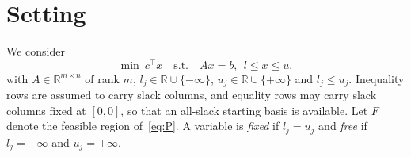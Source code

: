 \documentclass[11pt,a4paper]{article}
\theoremstyle{plain}
\theoremstyle{definition}
\theoremstyle{remark}
\newcommand{\R}{\mathbb{R}}
\begin{document}
\section{Setting}
\label{sec:setting}

We consider
\begin{equation}
  \min\ c^\top x \quad\text{s.t.}\quad Ax=b,\ \ l\le x\le u,
  \label{eq:P}
\end{equation}
with $A\in\R^{m\times n}$ of rank $m$, $l_j\in\R\cup\{-\infty\}$, $u_j\in\R\cup\{+\infty\}$ and $l_j\le u_j$. Inequality rows are assumed to carry slack columns, and equality rows may carry slack columns fixed at $[0,0]$, so that an all-slack starting basis is available. Let $F$ denote the feasible region of~\eqref{eq:P}. A variable is \emph{fixed} if $l_j=u_j$ and \emph{free} if $l_j=-\infty$ and $u_j=+\infty$.
\end{document}
